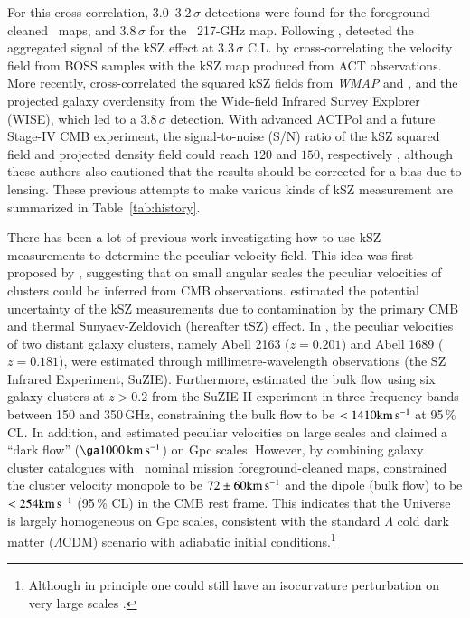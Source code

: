 \documentclass[traditabstract, longauth]{aa}
\newcommand{\1}{\'\i }
\def \kms{{\rm km\,s^{-1}}}
\begin{document}
For this cross-correlation, $3.0$--$3.2\,\sigma$
detections were found for the foreground-cleaned \Planck\ maps, and
$3.8\,\sigma$ for the \Planck\ 217-GHz map. Following
\citet{planck2015-XXXVII}, \citet{Schaan16} detected the aggregated signal of
the kSZ effect at $3.3\,\sigma$ C.L. by cross-correlating the velocity field from
BOSS samples with the kSZ map produced from ACT observations. More recently,
\citet{Hill16} cross-correlated the squared kSZ fields from {\it WMAP} and \Planck,
and the projected galaxy overdensity from the Wide-field Infrared Survey
Explorer (WISE), which led to a $3.8\,\sigma$ detection. With advanced ACTPol
and a future Stage-IV CMB experiment, the signal-to-noise (S/N) ratio of the
kSZ squared field and projected density field could reach $120$ and $150$,
respectively \citep{Ferraro16}, although these authors also cautioned that the
results should be corrected for a bias due to lensing.
These previous attempts to make various kinds
of kSZ measurement are summarized in Table~\ref{tab:history}.

There has been a lot of previous work investigating how to use kSZ measurements
to determine the peculiar velocity field. This idea was first proposed
by \cite{haehnelt95}, suggesting that on small angular scales the peculiar
velocities of clusters could be inferred from CMB observations. \cite{nabila01}
estimated the potential uncertainty of the kSZ measurements due to
contamination by the primary CMB and thermal Sunyaev-Zeldovich (hereafter tSZ)
effect. In \cite{holzapfeletal97}, the peculiar velocities of two distant
galaxy clusters, namely Abell 2163 ($z=0.201$) and Abell 1689 ($z=0.181$), were
estimated through millimetre-wavelength observations (the SZ Infrared
Experiment, SuZIE). Furthermore, \cite{bensonetal03} estimated the bulk flow
using six galaxy clusters at $z > 0.2$ from the SuZIE II experiment in three
frequency bands between 150 and 350\,GHz, constraining the bulk flow to be
$<1410 \kms$ at 95\,\% CL. In addition, \citet{kashlinsky00} and
\citet{kashlinsky08,kashlinsky09} estimated peculiar velocities on large scales
and claimed a ``dark flow'' ($\ga1000\,\kms$) on Gpc scales.
However, by combining
galaxy cluster catalogues with \Planck\ nominal mission foreground-cleaned
maps, \cite{planck2013-XIII} constrained the cluster velocity monopole to be
$72\pm 60 \kms$ and the dipole (bulk flow) to be $<254 \kms$ (95\,\% CL) in the
CMB rest frame. This indicates that the Universe is largely homogeneous on Gpc
scales, consistent with the standard $\Lambda$ cold dark matter ($\Lambda$CDM)
scenario with adiabatic initial conditions.\footnote{Although in principle one
could still have an isocurvature perturbation on very large scales
\citep{Turner91,Ma-Gordon11}.}
\end{document}
